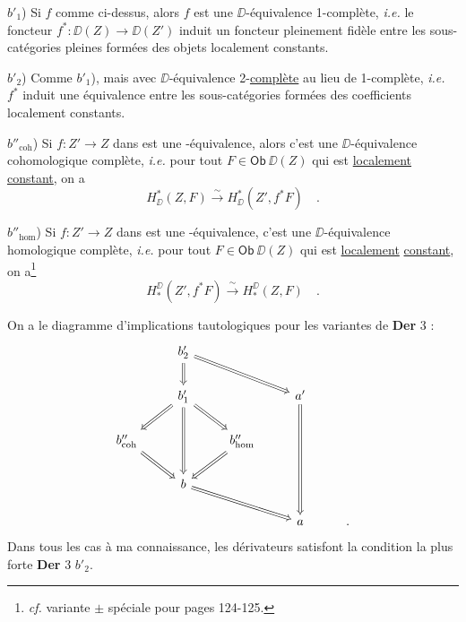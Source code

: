 $b'_1$) Si $f$ comme ci-dessus, alors $f$ est une $\DD$-équivalence 1-complète, \textit{i.e.} le foncteur $f^{*} : \DD(Z) \to \DD(Z')$ induit un foncteur pleinement fidèle
entre les sous-catégories pleines formées des objets localement constants.

$b'_2$) Comme $b'_1$), mais avec $\DD$-équivalence 2-\underline{complète} au lieu de 1-complète, \textit{i.e.} $f^{*}$ induit une équivalence entre les sous-catégories formées des coefficients localement constants.

$b''_{\mathrm{coh}}$) Si $f : Z' \to Z$ dans \Dia{} est une \Hot-équivalence, alors c'est une $\DD$-équivalence cohomologique complète, \textit{i.e.} pour tout $F \in \mathsf{Ob}\ \DD(Z)$ qui est \underline{localement} \underline{constant}, on a
\[ H^{*}_{\DD}(Z,F) \xrightarrow{\ \sim\ } H^{*}_{\DD}(Z',f^{*}F) \quad . \]

$b''_{\mathrm{hom}}$) Si $f : Z' \to Z$ dans \Dia{} est une \Hot-équivalence, c'est une $\DD$-équivalence homologique complète, \textit{i.e.} pour tout $F \in \mathsf{Ob}\ \DD(Z)$ qui est \underline{localement} \underline{constant}, on a\footnote[59]{\textit{cf.} variante $\pm$ spéciale pour \HOT{} pages 124-125.}
\[ H_{*}^{\DD}(Z',f^{*}F) \xrightarrow{\ \sim\ } H_{*}^{\DD}(Z,F) \quad . \]


On a le diagramme d'implications tautologiques pour les variantes de \textbf{Der} 3 :
\[
\begin{tikzcd}
 & b'_2 \arrow[d, Rightarrow] \arrow[drr, Rightarrow] & & & \\
 & b'_1 \arrow[dl, Rightarrow] \arrow[dr, Rightarrow] \arrow[dd, Rightarrow] & & a' \arrow[ddd, Rightarrow] & \\
b''_{\mathrm{coh}} \arrow[dr, Rightarrow] & & b''_{\mathrm{hom}} \arrow[dl, Rightarrow] & & \\
 & b \arrow[drr, Rightarrow] & & & \\
 & & & a & .
\end{tikzcd}
\]
Dans tous les cas à ma connaissance, les dérivateurs satisfont la condition la plus forte \textbf{Der} 3 $b'_2$.

